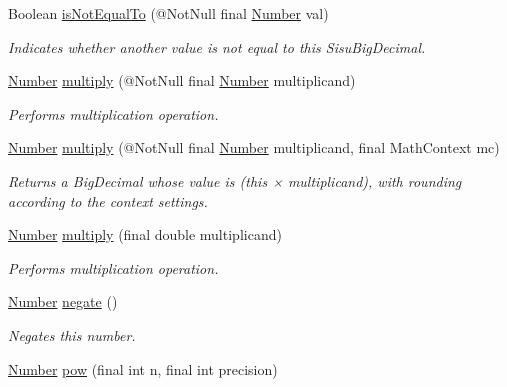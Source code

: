 \begin{DoxyCompactItemize}
Boolean \hyperlink{interfacecom_1_1aarrelaakso_1_1drawl_1_1_number_a4684335f60995aca55e4b972fbb3b8ca}{is\+Not\+Equal\+To} (@Not\+Null final \hyperlink{interfacecom_1_1aarrelaakso_1_1drawl_1_1_number}{Number} val)
\begin{DoxyCompactList}\small\item\em Indicates whether another value is not equal to this Sisu\+Big\+Decimal. \end{DoxyCompactList}\item 
\hyperlink{interfacecom_1_1aarrelaakso_1_1drawl_1_1_number}{Number} \hyperlink{interfacecom_1_1aarrelaakso_1_1drawl_1_1_number_a4748fed26ef4d662d7a277dc2687acca}{multiply} (@Not\+Null final \hyperlink{interfacecom_1_1aarrelaakso_1_1drawl_1_1_number}{Number} multiplicand)
\begin{DoxyCompactList}\small\item\em Performs multiplication operation. \end{DoxyCompactList}\item 
\hyperlink{interfacecom_1_1aarrelaakso_1_1drawl_1_1_number}{Number} \hyperlink{interfacecom_1_1aarrelaakso_1_1drawl_1_1_number_a8e43a4a565fb62b7f71a809aa791ecc2}{multiply} (@Not\+Null final \hyperlink{interfacecom_1_1aarrelaakso_1_1drawl_1_1_number}{Number} multiplicand, final Math\+Context mc)
\begin{DoxyCompactList}\small\item\em Returns a Big\+Decimal whose value is (this × multiplicand), with rounding according to the context settings. \end{DoxyCompactList}\item 
\hyperlink{interfacecom_1_1aarrelaakso_1_1drawl_1_1_number}{Number} \hyperlink{interfacecom_1_1aarrelaakso_1_1drawl_1_1_number_a47435944efde1dec963b401dbdf45d62}{multiply} (final double multiplicand)
\begin{DoxyCompactList}\small\item\em Performs multiplication operation. \end{DoxyCompactList}\item 
\hyperlink{interfacecom_1_1aarrelaakso_1_1drawl_1_1_number}{Number} \hyperlink{interfacecom_1_1aarrelaakso_1_1drawl_1_1_number_abeb61241a83c318464f15c0059d65885}{negate} ()
\begin{DoxyCompactList}\small\item\em Negates this number. \end{DoxyCompactList}\item 
\hyperlink{interfacecom_1_1aarrelaakso_1_1drawl_1_1_number}{Number} \hyperlink{interfacecom_1_1aarrelaakso_1_1drawl_1_1_number_a38679e8f0f11db201ee07e3b0541b6a4}{pow} (final int n, final int precision)

\end{DoxyCompactItemize}
